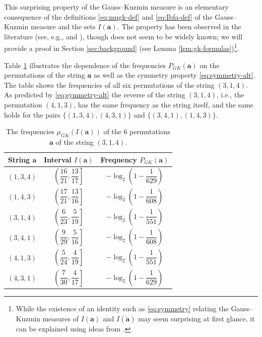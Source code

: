 \documentclass[10pt]{article}
\theoremstyle{definition}
\numberwithin{equation}{section}
\numberwithin{lemma}{section}
\newcommand{\bfa}{\mathbf{a}}
\newcommand{\bfar}{\overleftarrow{\bfa}}
\begin{document}
This surprising property of the Gauss--Kuzmin measure is an elementary
consequence of the definitions \eqref{eq:mugk-def}  and
\eqref{eq:Ibfa-def} of the Gauss--Kuzmin measure and the sets 
$I(\bfa)$. The property has been observed
in the literature (see, e.g., \cite[p.~189]{levy1929} and 
\cite[p.~430]{vandehey2016}),
though does not seem to be widely known; we will provide a proof in
Section \ref{sec:background} (see Lemma 
\ref{lem:gk-formulas})\footnote{%
While the existence of an identity such as \eqref{eq:symmetry}
relating the Gauss--Kuzmin measures of 
$I(\bfa)$ and $I(\bfar)$ may seem surprising at first glance, it can 
be explained using ideas from \cite[Section 5.3]{dajani-kraaikamp-book}.}.

Table \ref{tab:table1} illustrates the dependence of the frequencies
$P_{GK}(\bfa)$ on the permutations of the string $\bfa$ as well as
the symmetry property  \eqref{eq:symmetry-alt}.
The table shows 
the frequencies of all six permutations of the string
$(3,1,4)$.
As predicted by 
\eqref{eq:symmetry-alt}
the reverse of the string $(3,1,4)$, i.e.,  the permutation  $(4,1,3)$, 
has the same frequency as the string itself, and the same holds for
the pairs $\{(1,3,4), (4,3,1)\}$ and $\{(3,4,1),(1,4,3)\}$.

\begin{table}[H]
\begin{center}
\renewcommand{\arraystretch}{2.5}
\addtolength{\tabcolsep}{5pt}
\begin{tabular}{|c|c|c|}
\hline
String $\bfa$ & Interval $I(\bfa)$ & Frequency $P_{GK}(\bfa)$
\\
\hline
 $(1,3,4)$ & $\left(\dfrac{16}{21},\dfrac{13}{17}\right]$ & 
 $-\log_2\left(1-\dfrac{1}{629}\right)$ \\
 $(1,4,3)$ & $\left(\dfrac{17}{21},\dfrac{13}{16}\right]$ & 
 $-\log_2\left(1-\dfrac{1}{608}\right)$ \\
 $(3,1,4)$ & $\left(\dfrac{6}{23},\dfrac{5}{19}\right]$ & 
 $-\log_2\left(1-\dfrac{1}{551}\right)$ \\
 $(3,4,1)$ & $\left(\dfrac{9}{29},\dfrac{5}{16}\right]$ &
 $-\log_2\left(1-\dfrac{1}{608}\right)$ \\
 $(4,1,3)$ & $\left(\dfrac{5}{24},\dfrac{4}{19}\right]$ & 
 $-\log_2\left(1-\dfrac{1}{551}\right)$ \\
 $(4,3,1)$ & $\left(\dfrac{7}{30},\dfrac{4}{17}\right]$ & 
 $-\log_2\left(1-\dfrac{1}{629}\right)$ \\
 \hline
 \end{tabular}
 \end{center}
\caption{The frequencies $\mu_{GK}(I(\bfa))$ 
of the $6$ permutations $\bfa$ of the string $(3,1,4)$.}
\label{tab:table1}
\end{table}
\end{document}
